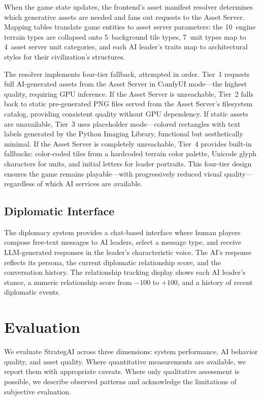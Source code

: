 \documentclass[conference]{IEEEtran}
\begin{document}
When the game state updates, the frontend's asset manifest resolver
determines which generative assets are needed and fans out requests to the
Asset Server. Mapping tables translate game entities to asset server
parameters: the 10~engine terrain types are collapsed onto 5~background
tile types, 7~unit types map to 4~asset server unit categories, and each AI
leader's traits map to architectural styles for their civilization's
structures.

The resolver implements four-tier fallback, attempted in order. Tier~1
requests full AI-generated assets from the Asset Server in ComfyUI
mode---the highest quality, requiring GPU inference. If the Asset Server
is unreachable, Tier~2 falls back to static pre-generated PNG files served
from the Asset Server's filesystem catalog, providing consistent quality
without GPU dependency. If static assets are unavailable, Tier~3 uses
placeholder mode---colored rectangles with text labels generated by the
Python Imaging Library, functional but aesthetically minimal. If the Asset
Server is completely unreachable, Tier~4 provides built-in fallbacks:
color-coded tiles from a hardcoded terrain color palette, Unicode glyph
characters for units, and initial letters for leader portraits. This
four-tier design ensures the game remains playable---with progressively
reduced visual quality---regardless of which AI services are available.

\subsection{Diplomatic Interface}

The diplomacy system provides a chat-based interface where human players
compose free-text messages to AI leaders, select a message type, and
receive LLM-generated responses in the leader's characteristic voice. The
AI's response reflects its persona, the current diplomatic relationship
score, and the conversation history. The relationship tracking display
shows each AI leader's stance, a numeric relationship score from $-100$ to
$+100$, and a history of recent diplomatic events.

\FloatBarrier
\section{Evaluation}
\label{sec:evaluation}

We evaluate StrategAI across three dimensions: system performance, AI
behavior quality, and asset quality. Where quantitative measurements are
available, we report them with appropriate caveats. Where only qualitative
assessment is possible, we describe observed patterns and acknowledge the
limitations of subjective evaluation.
\end{document}
